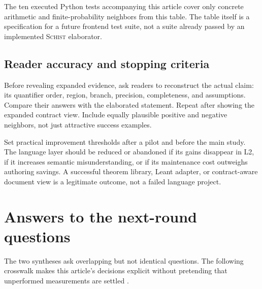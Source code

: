 \documentclass[11pt,a4paper]{article}
\newcommand{\Schist}{\textsc{Schist}}
\theoremstyle{definition}
\begin{document}
The ten executed Python tests accompanying this article cover only concrete
arithmetic and finite-probability neighbors from this table. The table itself
is a specification for a future frontend test suite, not a suite already passed
by an implemented \Schist{} elaborator.

\subsection{Reader accuracy and stopping criteria}
Before revealing expanded evidence, ask readers to reconstruct the actual
claim: its quantifier order, region, branch, precision, completeness, and
assumptions. Compare their answers with the elaborated statement. Repeat after
showing the expanded contract view. Include equally plausible positive and
negative neighbors, not just attractive success examples.

Set practical improvement thresholds after a pilot and before the main study.
The language layer should be reduced or abandoned if its gains disappear in
L2, if it increases semantic misunderstanding, or if its maintenance cost
outweighs authoring savings. A successful theorem library, Leant adapter, or
contract-aware document view is a legitimate outcome, not a failed language
project.

\section{Answers to the next-round questions}\label{sec:answers}
The two syntheses ask overlapping but not identical questions. The following
crosswalk makes this article's decisions explicit without pretending that
unperformed measurements are settled \cite{round2a,round2b}.
\end{document}
